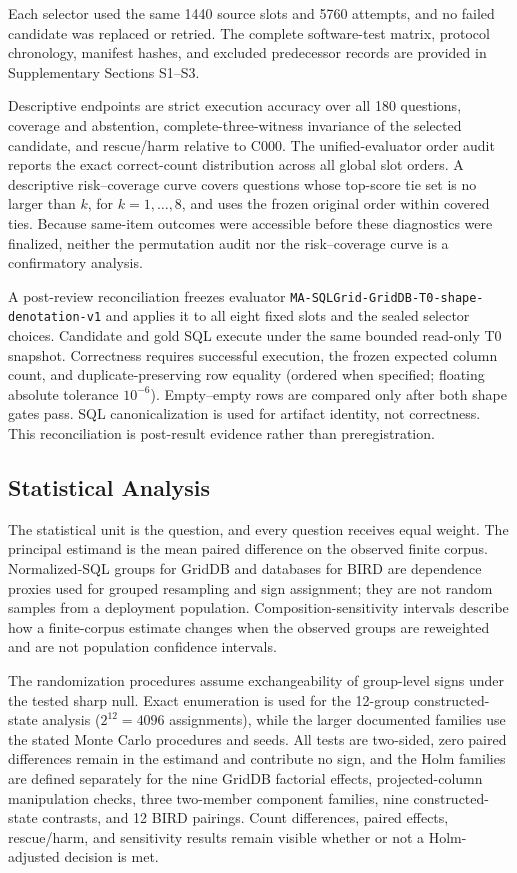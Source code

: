 \documentclass[information,article,submit,moreauthors]{Definitions/mdpi}
\begin{document}
Each selector used the same 1440 source slots and 5760 attempts, and no failed candidate was replaced or retried. The complete software-test matrix, protocol chronology, manifest hashes, and excluded predecessor records are provided in Supplementary Sections S1--S3.

Descriptive endpoints are strict execution accuracy over all 180 questions, coverage and abstention, complete-three-witness invariance of the selected candidate, and rescue/harm relative to C000. The unified-evaluator order audit reports the exact correct-count distribution across all global slot orders. A descriptive risk--coverage curve covers questions whose top-score tie set is no larger than $k$, for $k=1,\ldots,8$, and uses the frozen original order within covered ties. Because same-item outcomes were accessible before these diagnostics were finalized, neither the permutation audit nor the risk--coverage curve is a confirmatory analysis.

A post-review reconciliation freezes evaluator \nolinkurl{MA-SQLGrid-GridDB-T0-shape-denotation-v1} and applies it to all eight fixed slots and the sealed selector choices. Candidate and gold SQL execute under the same bounded read-only T0 snapshot. Correctness requires successful execution, the frozen expected column count, and duplicate-preserving row equality (ordered when specified; floating absolute tolerance $10^{-6}$). Empty--empty rows are compared only after both shape gates pass. SQL canonicalization is used for artifact identity, not correctness. This reconciliation is post-result evidence rather than preregistration.

\subsection{Statistical Analysis}

The statistical unit is the question, and every question receives equal weight. The principal estimand is the mean paired difference on the observed finite corpus. Normalized-SQL groups for GridDB and databases for BIRD are dependence proxies used for grouped resampling and sign assignment; they are not random samples from a deployment population. Composition-sensitivity intervals describe how a finite-corpus estimate changes when the observed groups are reweighted and are not population confidence intervals.

The randomization procedures assume exchangeability of group-level signs under the tested sharp null. Exact enumeration is used for the 12-group constructed-state analysis ($2^{12}=4096$ assignments), while the larger documented families use the stated Monte Carlo procedures and seeds. All tests are two-sided, zero paired differences remain in the estimand and contribute no sign, and the Holm families are defined separately for the nine GridDB factorial effects, projected-column manipulation checks, three two-member component families, nine constructed-state contrasts, and 12 BIRD pairings. Count differences, paired effects, rescue/harm, and sensitivity results remain visible whether or not a Holm-adjusted decision is met.
\end{document}
